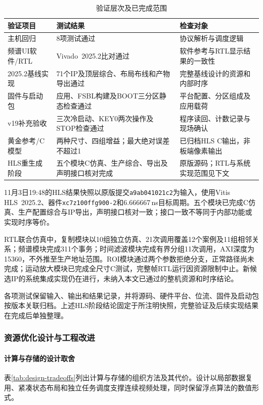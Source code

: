 \documentclass[UTF8,a4paper,zihao=-4,fontset=none]{ctexart}
\renewcommand{\small}{\fontsize{10.5pt}{13pt}\selectfont}
\numberwithin{figure}{section}
\numberwithin{table}{section}
\begin{document}
\begin{table}[htbp]
\centering\small
\caption{验证层次及已完成范围}\label{tab:validation-results}
\begin{tabularx}{\linewidth}{@{}p{3.1cm}X p{4.1cm}@{}}
\toprule
验证项目 & 测试结果 & 检查对象 \\
\midrule
主机回归 & 8项测试通过 & 协议解析与调度逻辑 \\
频谱UI软件/RTL & Vivado~2025.2比对通过 & 软件参考与RTL显示结果的一致性 \\
2025.2基线实现 & 71个IP及顶层综合、布局布线和产物导出通过 & 完整基线设计的资源和内部时序 \\
固件与启动包 & 应用、FSBL构建及BOOT三分区静态检查通过 & 平台配置、分区组成及应用载荷 \\
v19补充验收 & 三次冷启动、KEY0两次操作及STOP检查通过 & 程序读回、计数记录与现场确认 \\
黄金参考/C模型 & 两种尺寸、四组增益；最大绝对误差不超过1 & 已归档HLS C输出，非板端像素输出 \\
HLS重生成阶段 & 五个模块C仿真、生产综合、导出及声明接口核对完成 & 原版源码；RTL与系统实现范围见下文 \\
\bottomrule
\end{tabularx}
\end{table}

11月3日19:48的HLS结果快照以原版提交\texttt{a9ab041021c2}为输入，使用Vitis HLS~2025.2、器件\texttt{xc7z100ffg900-2}和6.666667\,ns目标周期。五个模块已完成C仿真、生产配置综合与IP导出，声明接口核对一致；接口一致不等同于内部功能或实现时序等价。

RTL联合仿真中，复制模块以10组独立仿真、21次调用覆盖12个案例及11组相邻关系；频谱模块完成311个事务；时间滤波模块完成有界分组11次调用，AXI深度为15360，不外推至生产地址范围。ROI模块通过两个参数拒绝分支，正常路径尚未完成；运动放大模块已完成全尺寸C测试，完整帧RTL运行因资源限制中止。新候选IP的系统集成实现仍在进行，未纳入本文已通过的整机资源和时序结论。

各项测试保留输入、输出和结果记录，并将源码、硬件平台、位流、固件及启动包按版本关联归档。上述HLS阶段结论固定于所注明快照，完整验证及后续实现结果在完成后单独整理。

\subsubsection{资源优化设计与工程改进}
\paragraph{计算与存储的设计取舍}
表\ref{tab:design-tradeoffs}列出计算与存储的组织方法及其代价。设计以局部数据复用、紧凑状态布局和独立任务调度支撑连续视频处理，同时保留浮点算法的数值形式。
\end{document}
